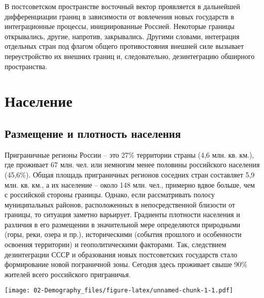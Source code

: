 \documentclass[]{book}
\begin{document}
В постсоветском пространстве восточный вектор проявляется в дальнейшей
дифференциации границ в зависимости от вовлечения новых государств в
интеграционные процессы, инициированные Россией. Некоторые границы
открывались, другие, напротив, закрывались. Другими словами, интеграция
отдельных стран под флагом общего противостояния внешней силе вызывает
переустройство их внешних границ и, следовательно, дезинтеграцию
обширного пространства.

\chapter{Население}\label{pop}

\section{Размещение и плотность населения}\label{demo-dens}

Приграничные регионы России -- это 27\% территории страны (4,6 млн. кв.
км.), где проживает 67 млн. чел. или немногим менее половины российского
населения (45,6\%). Общая площадь приграничных регионов соседних стран
составляет 5,9 млн. кв. км., а их население -- около 148 млн. чел.,
примерно вдвое больше, чем с российской стороны границы. Однако, если
рассматривать полосу муниципальных районов, расположенных в
непосредственной близости от границы, то ситуация заметно варьирует.
Градиенты плотности населения и различия в его размещении в значительной
мере определяются природными (горы, реки, озера и пр.), историческими
(события прошлого и особенности освоения территории) и геополитическими
факторами. Так, следствием дезинтеграции СССР и образования новых
постсоветских государств стало формирование новой пограничной зоны.
Сегодня здесь проживает свыше 90\% жителей всего российского
приграничья.

\texttt{[image: 02-Demography\_files/figure-latex/unnamed-chunk-1-1.pdf]}
\end{document}
